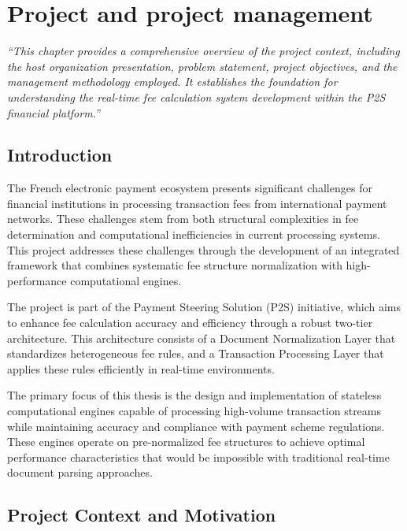 \chapter{Project and project management}\label{chap:intro}

\textit{``This chapter provides a comprehensive overview of the project context, including the host organization presentation, problem statement, project objectives, and the management methodology employed. It establishes the foundation for understanding the real-time fee calculation system development within the P2S financial platform.''}

\pagebreak

\section{Introduction}

The French electronic payment ecosystem presents significant challenges for financial institutions in processing transaction fees from international payment networks. These challenges stem from both structural complexities in fee determination and computational inefficiencies in current processing systems. This project addresses these challenges through the development of an integrated framework that combines systematic fee structure normalization with high-performance computational engines.

The project is part of the Payment Steering Solution (P2S) initiative, which aims to enhance fee calculation accuracy and efficiency through a robust two-tier architecture. This architecture consists of a Document Normalization Layer that standardizes heterogeneous fee rules, and a Transaction Processing Layer that applies these rules efficiently in real-time environments.

The primary focus of this thesis is the design and implementation of stateless computational engines capable of processing high-volume transaction streams while maintaining accuracy and compliance with payment scheme regulations. These engines operate on pre-normalized fee structures to achieve optimal performance characteristics that would be impossible with traditional real-time document parsing approaches.

\section{Project Context and Motivation}

